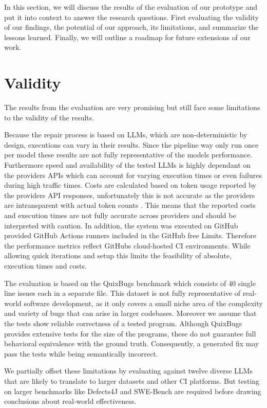 In this section, we will discuss the results of the evaluation of our prototype and put it into context to answer the research questions. First evaluating the validity of our findings, the potential of our approach, its limitations, and summarize the lessons learned. Finally, we will outline a roadmap for future extensions of our work.

\section{Validity} \label{section:validity}
The results from the evaluation are very promising but still face some limitations to the validity of the results.

Because the repair process is based on LLMs, which are non-deterministic by design, executions can vary in their results. Since the pipeline way only run once per model these results are not fully representative of the models performance. Furthermore speed and availability of the tested LLMs is highly dependant on the providers APIs which can account for varying execution times or even failures during high traffic times. Costs are calculated based on token usage reported by the providers API responses, unfortunately this is not accurate as the providers are intransparent with actual token counts \cite{sunCoInCountingInvisible2025d}. This means that the reported costs and execution times are not fully accurate across providers and should be interpreted with caution.
In addition, the system was executed on GitHub provided GitHub Actions runners included in the GitHub free Limits. Therefore the performance metrics reflect GitHubs cloud-hosted CI environments. While allowing quick iterations and setup this limits the feasibility of absolute, execution times and costs.

The evaluation is based on the QuixBugs benchmark which consists of 40 single line issues each in a separate file. This dataset is not fully representative of real-world software development, as it only covers a small niche area of the complexity and variety of bugs that can arise in larger codebases. Moreover we assume that the tests show reliable correctness of a tested program. Although QuixBugs provides extensive tests for the size of the programs, these do not guarantee full behavioral equivalence with the ground truth. Consequently, a generated fix may pass the tests while being semantically incorrect.

We partially offset these limitations by evaluating against twelve diverse LLMs that are likely to translate to larger datasets and other CI platforms. But testing on larger benchmarks like Defects4J and SWE-Bench are required before drawing conclusions about real-world effectiveness.

